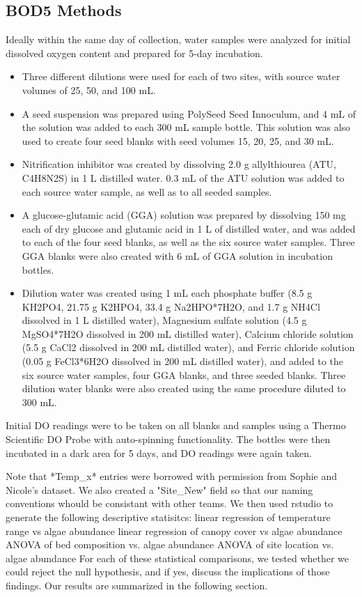 \documentclass{article}\usepackage[]{graphicx}\usepackage[]{color}
\begin{document}
\subsection{BOD5 Methods}

Ideally within the same day of collection, water samples were analyzed for initial dissolved oxygen content and prepared for 5-day incubation.  
\begin{itemize}
  \item Three different dilutions were used for each of two sites, with source water volumes of 25, 50, and 100 mL. 
  \item A seed suspension was prepared using PolySeed Seed Innoculum, and 4 mL of the solution was added to each 300 mL sample bottle. This solution was also used to create four seed blanks with seed volumes 15, 20, 25, and 30 mL.
  \item Nitrification inhibitor was created by dissolving 2.0 g allylthiourea (ATU, C4H8N2S) in 1 L distilled water. 0.3 mL of the ATU solution was added to each source water sample, as well as to all seeded samples. 
  \item A glucose-glutamic acid (GGA) solution was prepared by dissolving 150 mg each of dry glucose and glutamic acid in 1 L of distilled water, and was added to each of the four seed blanks, as well as the six source water samples. Three GGA blanks were also created with 6 mL of GGA solution in incubation bottles. 
  \item Dilution water was created using 1 mL each phosphate buffer (8.5 g KH2PO4, 21.75 g K2HPO4, 33.4 g Na2HPO*7H2O, and 1.7 g NH4Cl dissolved in 1 L distilled water), Magnesium sulfate solution (4.5 g MgSO4*7H2O dissolved in 200 mL distilled water), Calcium chloride solution (5.5 g CaCl2 dissolved in 200 mL distilled water), and Ferric chloride solution (0.05 g FeCl3*6H2O dissolved in 200 mL distilled water), and added to the six source water samples, four GGA blanks, and three seeded blanks. Three dilution water blanks were also created using the same procedure diluted to 300 mL.
\end{itemize}
Initial DO readings were to be taken on all blanks and samples using a Thermo Scientific DO Probe with auto-spinning functionality. The bottles were then incubated in a dark area for 5 days, and DO readings were again taken.  

Note that *Temp\_x* entries were borrowed with permission from Sophie and Nicole's dataset. We also created a "Site\_New" field so that our naming conventions whould be consistant with other teams. We then used rstudio to generate the following descriptive statisitcs:  
linear regression of temperature range vs algae abundance
linear regression of canopy cover vs algae abundance
ANOVA of bed composition vs. algae abundance
ANOVA of site location vs. algae abundance
For each of these statistical comparisons, we tested whether we could reject the null hypothesis, and if yes, discuss the implications of those findings. Our results are summarized in the following section. 
\end{document}
